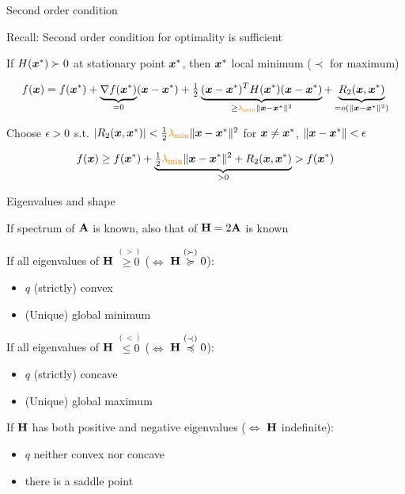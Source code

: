 \documentclass[11pt,compress,t,notes=noshow, xcolor=table]{beamer}
\begin{document}
\begin{framei}[fs=footnotesize]{Second order condition}
\item Recall: Second order condition for optimality is sufficient
\item If $H(\bm{x}^\ast) \succ 0$ at stationary point $\bm{x}^\ast$, then $\bm{x}^\ast$ local minimum ($\prec$ for maximum)
\item[] \begin{equation*}
f(\bm{x}) = f(\bm{x}^\ast) + \underbrace{\nabla f(\bm{x}^\ast)}_{=0}(\bm{x}-\bm{x}^\ast) + \tfrac{1}{2}\underbrace{(\bm{x}-\bm{x}^\ast)^T H(\bm{x}^\ast)(\bm{x}-\bm{x}^\ast)}_{\ge \textcolor{orange}{\lambda_\text{min}} \|\bm{x}-\bm{x}^\ast\|^2} + \underbrace{R_2(\bm{x},\bm{x}^\ast)}_{=o(\|\bm{x}-\bm{x}^\ast\|^2)}
\end{equation*}
\item Choose $\epsilon>0$ s.t. $|R_2(\bm{x},\bm{x}^\ast)| < \tfrac{1}{2} \textcolor{orange}{\lambda_\text{min}} \|\bm{x}-\bm{x}^\ast\|^2$ for $\bm{x} \neq \bm{x}^\ast$, $\|\bm{x}-\bm{x}^\ast\|<\epsilon$
\item[] \begin{equation*}
f(\bm{x}) \ge f(\bm{x}^\ast) + \underbrace{\tfrac{1}{2} \textcolor{orange}{\lambda_\text{min}} \|\bm{x}-\bm{x}^\ast\|^2 + R_2(\bm{x},\bm{x}^\ast)}_{>0} > f(\bm{x}^\ast)
\end{equation*}
\end{framei}

\begin{framei}{Eigenvalues and shape}
\item If spectrum of $\mathbf{A}$ is known, also that of $\mathbf{H} = 2\mathbf{A}$ is known
\item If all eigenvalues of $\mathbf{H}$ $\overset{(>)}{\ge 0}$ ($\Leftrightarrow$ $\mathbf{H} \overset{(\succ)}{\succcurlyeq} 0$):
\begin{itemize}
\item $q$ (strictly) convex
\item (Unique) global minimum
\end{itemize}
\item If all eigenvalues of $\mathbf{H}$ $\overset{(<)}{\le 0}$ ($\Leftrightarrow$ $\mathbf{H} \overset{(\prec)}{\preccurlyeq} 0$):
\begin{itemize}
\item $q$ (strictly) concave
\item (Unique) global maximum
\end{itemize}
\item If $\mathbf{H}$ has both positive and negative eigenvalues ($\Leftrightarrow$ $\mathbf{H}$ indefinite):
\begin{itemize}
\item $q$ neither convex nor concave
\item there is a saddle point
\end{itemize}
\end{framei}
\end{document}

